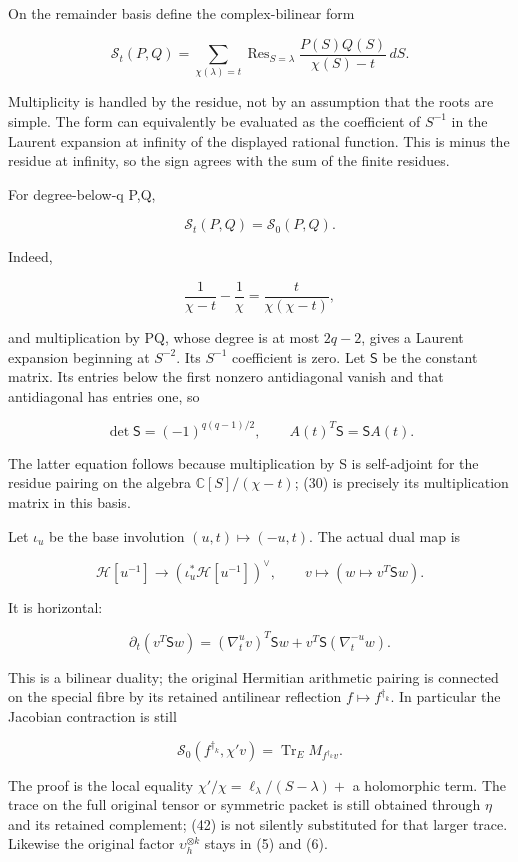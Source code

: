 \documentclass[
  11pt,
]{article}
\begin{document}
On the remainder basis define the complex-bilinear form

\[
\mathscr S_t(P,Q)=\sum_{\chi(\lambda)=t}
\operatorname{Res}_{S=\lambda}\frac{P(S)Q(S)}{\chi(S)-t}\,dS.
\tag{37}
\]

Multiplicity is handled by the residue, not by an assumption that the
roots are simple. The form can equivalently be evaluated as the
coefficient of \(S^{-1}\) in the Laurent expansion at infinity of the
displayed rational function. This is minus the residue at infinity, so
the sign agrees with the sum of the finite residues.

For degree-below-q P,Q,

\[
\boxed{\mathscr S_t(P,Q)=\mathscr S_0(P,Q).}
\tag{38}
\]

Indeed,

\[
\frac1{\chi-t}-\frac1\chi=\frac{t}{\chi(\chi-t)},
\]

and multiplication by PQ, whose degree is at most \(2q-2\), gives a
Laurent expansion beginning at \(S^{-2}\). Its \(S^{-1}\) coefficient is
zero. Let \(\mathsf S\) be the constant matrix. Its entries below the
first nonzero antidiagonal vanish and that antidiagonal has entries one,
so

\[
\det\mathsf S=(-1)^{q(q-1)/2},\qquad
\boxed{A(t)^T\mathsf S=\mathsf S A(t).}
\tag{39}
\]

The latter equation follows because multiplication by S is self-adjoint
for the residue pairing on the algebra \(\mathbb C[S]/(\chi-t)\); (30)
is precisely its multiplication matrix in this basis.

Let \(\iota_u\) be the base involution \((u,t)\mapsto(-u,t)\). The
actual dual map is

\[
\boxed{\mathcal H[u^{-1}]\longrightarrow
(\iota_u^*\mathcal H[u^{-1}])^\vee,
\qquad v\longmapsto(w\mapsto v^T\mathsf S w).}
\tag{40}
\]

It is horizontal:

\[
\partial_t(v^T\mathsf S w)
=(\nabla_t^{u}v)^T\mathsf S w
+v^T\mathsf S(\nabla_t^{-u}w).
\tag{41}
\]

This is a bilinear duality; the original Hermitian arithmetic pairing is
connected on the special fibre by its retained antilinear reflection
\(f\mapsto f^{\dagger_k}\). In particular the Jacobian contraction is
still

\[
\boxed{\mathscr S_0(f^{\dagger_k},\chi'v)
=\operatorname{Tr}_{E}M_{f^{\dagger_k}v}.}
\tag{42}
\]

The proof is the local equality \(\chi'/\chi=\ell_\lambda/(S-\lambda)+\)
a holomorphic term. The trace on the full original tensor or symmetric
packet is still obtained through \(\eta\) and its retained complement;
(42) is not silently substituted for that larger trace. Likewise the
original factor \(\upsilon_h^{\otimes k}\) stays in (5) and (6).
\end{document}
